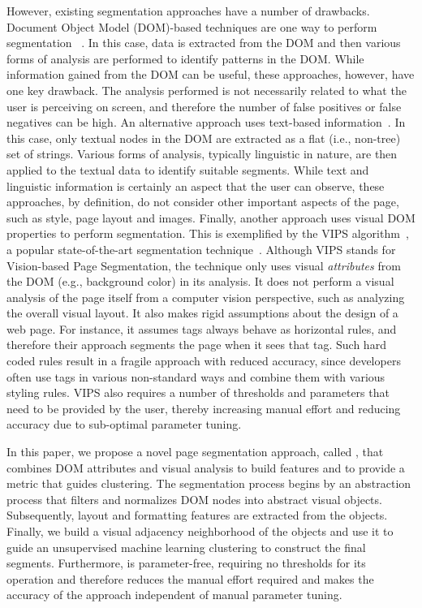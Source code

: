 However, existing segmentation approaches 
have a number of drawbacks.
Document Object Model (DOM)-based techniques
are one way to perform segmentation
~\cite{rajkumar2012dynamic,vineel2009web,kang2010repetition}.
In this case, data is extracted from the DOM
and then various forms of analysis are performed to identify
patterns in the DOM.
While information gained from the DOM can be useful,
these approaches, however, have one key drawback.
The analysis performed is not necessarily related
to what the user is perceiving on screen,
and therefore the number of false positives
or false negatives can be high.
An alternative approach uses text-based information~\cite{kohlschutter2008densitometric, kolcz2007site}.
In this case, only textual nodes in the DOM are extracted
as a flat (i.e., non-tree) set of strings.
Various forms of analysis,
typically linguistic in nature,
are then applied to the textual data to identify
suitable segments.
While text and linguistic information is certainly
an aspect that the user can observe,
these approaches, by definition,
do not consider other important aspects of the page,
such as style, page layout and images.
Finally, another approach uses visual DOM properties 
to perform segmentation.
This is exemplified by the VIPS algorithm~\cite{cai2003vips},
a popular state-of-the-art segmentation technique~\cite{sleiman2013survey,campus2011web}.
Although VIPS stands for Vision-based Page Segmentation,
the technique only uses visual \emph{attributes} from the DOM 
(e.g., background color) in its analysis.
It does not perform a visual analysis of the page itself from a computer vision perspective,
such as analyzing the overall visual layout.
It also makes rigid assumptions about the design of a web page.
For instance, it assumes  tags always behave as horizontal rules,
and therefore their approach segments the page when it sees that tag.
Such hard coded rules result in a fragile approach with reduced accuracy,
since developers often use tags in various non-standard ways
and combine them with various styling rules.
VIPS also requires a number of thresholds and parameters
that need to be provided by the user,
thereby increasing manual effort and reducing accuracy due to sub-optimal parameter tuning.

In this paper,
we propose a novel page segmentation approach, called \toolname, 
that combines DOM attributes and visual analysis to build features
and to provide a metric that guides clustering.
The segmentation process begins by an abstraction process that
filters and normalizes DOM nodes into abstract visual objects.
Subsequently, 
layout and formatting features are extracted from the objects. 
Finally, we build a visual adjacency neighborhood of the objects 
and use it to guide an unsupervised machine learning
clustering to construct the final segments.
Furthermore, \toolname is parameter-free,
requiring no thresholds for its operation and therefore
reduces the manual effort required and
makes the accuracy of the approach
independent of manual parameter tuning. 

